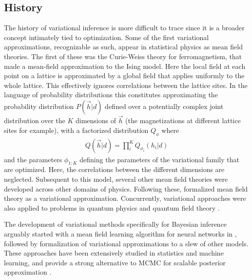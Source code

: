 \subsection{History}

The history of variational inference is more difficult to trace since it is a broader concept intimately tied to optimization. Some of the first variational approximations, recognizable as such, appear in statistical physics as mean field theories. The first of these was the Curie-Weiss theory for ferromagnetism, that made a mean-field approximation to the Ising model\cite{curie1895proprietes,  weiss1907hypothese}. Here the local field at each point on a lattice is approximated by a global field that applies uniformly to the whole lattice. This effectively ignores correlations between the lattice sites. In the language of probability distributions this constitutes approximating the probability distribution $P(\vec{h} | d)$ defined over a potentially complex joint distribution over the $K$ dimensions of $\vec{h}$ (the magnetizations at different lattice sites for example), with a factorized distribution $Q_\phi$ where
\begin{align}
Q(\vec{h}| d) = \prod_{i}^K Q_{\phi_i}(h_i | d)
\end{align}
and the parameters $\phi_{1:K}$ defining the parameters of the variational family that are optimized. Here, the correlations between the different dimensions are neglected. Subsequent to this model, several other mean field theories were developed across other domains of physics. Following these, \citet{landau1965collected} formalized mean field theory as a variational approximation\cite{kadanoff2009more}. Concurrently, variational approaches were also applied to problems in quantum physics and quantum field theory \citep{milton2006electromagnetic, feynman1965quantum}. 

The development of variational methods specifically for Bayesian inference arguably started with a mean field learning algorithm for neural networks in \citet{anderson1987mean}, followed by formalization of variational approximations to a slew of other models\citep{saul1996mean, jaakkola1997variational}. These approaches have been extensively studied in statistics and machine learning, and provide a strong alternative to MCMC for scalable posterior approximation \citep{blei2017variational, jordan1999introduction}.

